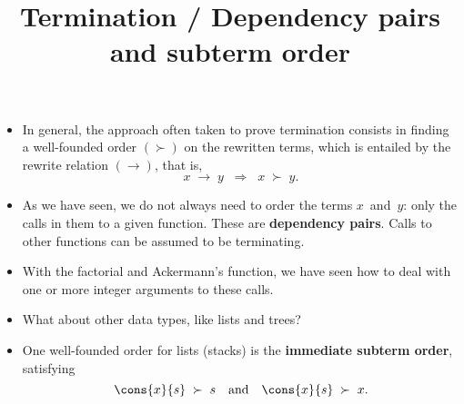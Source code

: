 \documentclass[wide]{slides}
\begin{document}
\begin{slide}
  \title{Termination / Dependency pairs and subterm order}

  \begin{itemize}

    \item In general, the approach often taken to prove termination
      consists in finding a well\hyp{}founded order \((\succ)\) on the
      rewritten terms, which is entailed by the rewrite relation
      \((\rightarrow)\), that is,
      \begin{equation*}
        x \; \rightarrow \; y \;\; \Rightarrow \;\; x \; \succ \; y.
      \end{equation*}

    \item As we have seen, we do not always need to order the terms
      \(x\)~and~\(y\): only the calls in them to a given
      function. These are \textbf{dependency pairs}. Calls to other
      functions can be assumed to be terminating.

    \item With the factorial and Ackermann's function, we have seen
      how to deal with one or more integer arguments to these calls.

    \item What about other data types, like lists and trees?

    \item One well\hyp{}founded order for lists (stacks) is the
      \textbf{immediate subterm order}, satisfying
      \begin{equation*}
        \cons{x}{s} \; \succ \; s \quad
        \text{and} \quad \cons{x}{s} \; \succ \; x.
      \end{equation*}

  \end{itemize}

\end{slide}
\end{document}
